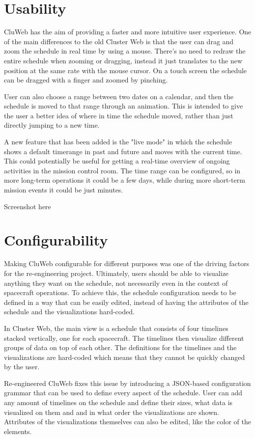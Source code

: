 \section{Usability}
CluWeb has the aim of providing a faster and more intuitive user experience. One of the main differences to the old Cluster Web is that the user can drag and zoom the schedule in real time by using a mouse. There's no need to redraw the entire schedule when zooming or dragging, instead it just translates to the new position at the same rate with the mouse cursor. On a touch screen the schedule can be dragged with a finger and zoomed by pinching.

User can also choose a range between two dates on a calendar, and then the schedule is moved to that range through an animation. This is intended to give the user a better idea of where in time the schedule moved, rather than just directly jumping to a new time.

 A new feature that has been added is the "live mode" in which the schedule shows a default timerange in past and future and moves with the current time. This could potentially be useful for getting a real-time overview of ongoing activities in the mission control room. The time range can be configured, so in more long-term operations it could be a few days, while during more short-term mission events it could be just minutes.
 
Screenshot here

\section{Configurability}
Making CluWeb configurable for different purposes was one of the driving factors for the re-engineering project. Ultimately, users should be able to visualize anything they want on the schedule, not necessarily even in the context of spacecraft operations. To achieve this, the schedule configuration needs to be defined in a way that can be easily edited, instead of having the attributes of the schedule and the visualizations hard-coded.

In Cluster Web, the main view is a schedule that consists of four timelines stacked vertically, one for each spacecraft. The timelines then visualize different groups of data on top of each other. The definitions for the timelines and the visualizations are hard-coded which means that they cannot be quickly changed by the user.

Re-engineered CluWeb fixes this issue by introducing a JSON-based configuration grammar that can be used to define every aspect of the schedule. User can add any amount of timelines on the schedule and define their sizes, what data is visualized on them and and in what order the visualizations are shown. Attributes of the visualizations themselves can also be edited, like the color of the elements.

